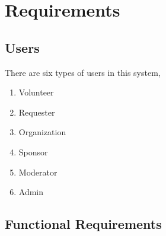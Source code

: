 \section{Requirements}
\subsection{Users}
There are six types of users in this system,
\begin{enumerate}
\itemsep0em 
	\item Volunteer
	\item Requester
	\item Organization
	\item Sponsor
        \item Moderator
        \item Admin
\end{enumerate}
\subsection{Functional Requirements}




% 

\clearpage